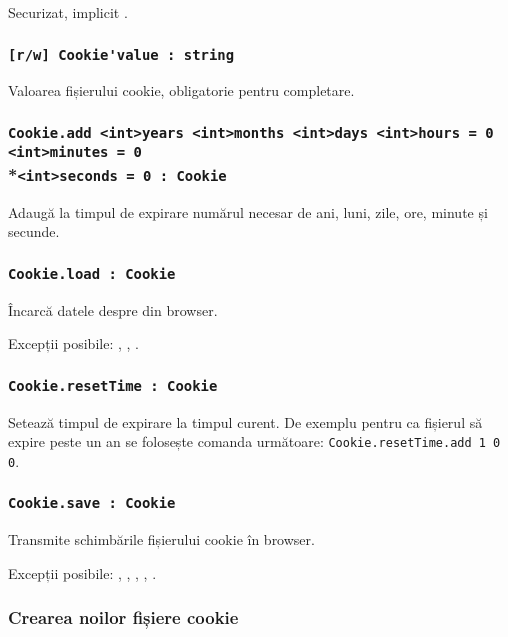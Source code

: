 Securizat, implicit \false.

\subsubsection{\lstinline|[r/w] Cookie'value : string|}

Valoarea fișierului cookie, obligatorie pentru completare.

\subsubsection{\lstinline|Cookie.add <int>years <int>months <int>days <int>hours = 0 <int>minutes = 0|\\*\noindent\lstinline|<int>seconds = 0 : Cookie|}

Adaugă la timpul de expirare numărul necesar de ani, luni, zile, ore, minute și secunde.

\subsubsection{\lstinline|Cookie.load : Cookie|}

Încarcă datele despre \cookie din browser.

Excepții posibile: , , .

\subsubsection{\lstinline|Cookie.resetTime : Cookie|}

Setează timpul de expirare la timpul curent. De exemplu pentru ca fișierul să expire peste un an se folosește comanda următoare: \lstinline|Cookie.resetTime.add 1 0 0|.

\subsubsection{\lstinline|Cookie.save : Cookie|}

Transmite schimbările fișierului cookie în browser.

Excepții posibile: , , , , .

\subsubsection{Crearea noilor fișiere cookie}

